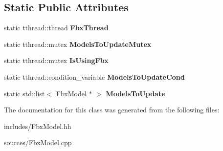 \subsection*{Static Public Attributes}
\begin{DoxyCompactItemize}
\item 
\hypertarget{class_fbx_model_a2630d48d8d3d8c90d52edb14a141e47c}{static tthread\-::thread {\bfseries Fbx\-Thread}}\label{class_fbx_model_a2630d48d8d3d8c90d52edb14a141e47c}

\item 
\hypertarget{class_fbx_model_ab776e342215caba1e79a8f938d436fd1}{static tthread\-::mutex {\bfseries Models\-To\-Update\-Mutex}}\label{class_fbx_model_ab776e342215caba1e79a8f938d436fd1}

\item 
\hypertarget{class_fbx_model_a5faad208701b1b50224cab0d31b5a772}{static tthread\-::mutex {\bfseries Is\-Using\-Fbx}}\label{class_fbx_model_a5faad208701b1b50224cab0d31b5a772}

\item 
\hypertarget{class_fbx_model_a4db39a0e17d87701e99c31fed4877c73}{static tthread\-::condition\-\_\-variable {\bfseries Models\-To\-Update\-Cond}}\label{class_fbx_model_a4db39a0e17d87701e99c31fed4877c73}

\item 
\hypertarget{class_fbx_model_ac3eb6500c88bc880f605cf45053dac6b}{static std\-::list$<$ \hyperlink{class_fbx_model}{Fbx\-Model} $\ast$ $>$ {\bfseries Models\-To\-Update}}\label{class_fbx_model_ac3eb6500c88bc880f605cf45053dac6b}

\end{DoxyCompactItemize}


The documentation for this class was generated from the following files\-:\begin{DoxyCompactItemize}
\item 
includes/Fbx\-Model.\-hh\item 
sources/Fbx\-Model.\-cpp\end{DoxyCompactItemize}
